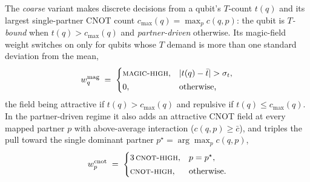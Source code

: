 
The \emph{coarse} variant makes discrete decisions from a qubit's $T$-count $t(q)$
and its largest single-partner CNOT count $c_{\max}(q)=\max_{p}c(q,p)$: the qubit
is \emph{$T$-bound} when $t(q)>c_{\max}(q)$ and \emph{partner-driven} otherwise.
Its magic-field weight switches on only for qubits whose $T$ demand is more than
one standard deviation from the mean,
\begin{equation*}
w^{\mathrm{mag}}_q \;=\;
\begin{cases}
\textsc{magic-high}, & |t(q)-\bar t|>\sigma_t,\\[2pt]
0, & \text{otherwise,}
\end{cases}
\end{equation*}
the field being attractive if $t(q)>c_{\max}(q)$ and repulsive if
$t(q)\le c_{\max}(q)$. In the partner-driven regime it also adds an attractive
CNOT field at every mapped partner $p$ with above-average interaction
($c(q,p)\ge\bar c$), and triples the pull toward the single dominant partner
$p^{\star}=\arg\max_p c(q,p)$,
\begin{equation*}
w^{\mathrm{cnot}}_{p} \;=\;
\begin{cases}
3\,\textsc{cnot-high}, & p=p^{\star},\\[2pt]
\textsc{cnot-high}, & \text{otherwise.}
\end{cases}
\end{equation*}